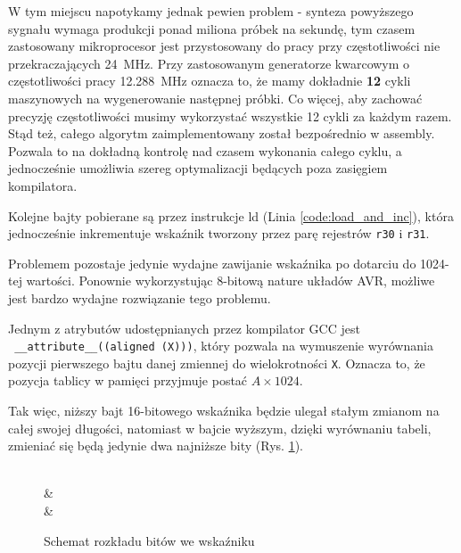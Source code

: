 \documentclass[12pt, a4paper]{article}
\begin{document}
W tym miejscu napotykamy jednak pewien problem - synteza powyższego sygnału wymaga produkcji ponad miliona próbek na sekundę,
tym czasem zastosowany mikroprocesor jest przystosowany do pracy przy częstotliwości nie przekraczających \qty{24}{\MHz}.
Przy zastosowanym generatorze kwarcowym o częstotliwości pracy \qty{12,288}{\MHz} oznacza to, że mamy dokładnie \textbf{12} cykli maszynowych
na wygenerowanie następnej próbki. Co więcej, aby zachować precyzję częstotliwości musimy wykorzystać wszystkie 12 cykli za każdym razem.
Stąd też, całego algorytm zaimplementowany został bezpośrednio w assembly.
Pozwala to na dokładną kontrolę nad czasem wykonania całego cyklu, a jednocześnie umożliwia szereg optymalizacji
będących poza zasięgiem kompilatora.

Kolejne bajty pobierane są przez instrukcje ld (Linia \ref{code:load_and_inc}), która jednocześnie
inkrementuje wskaźnik tworzony przez parę rejestrów \verb|r30| i \verb|r31|.

Problemem pozostaje jedynie wydajne zawijanie wskaźnika po dotarciu do 1024-tej wartości.
Ponownie wykorzystując 8-bitową nature układów AVR, możliwe jest bardzo wydajne rozwiązanie tego problemu.

Jednym z atrybutów udostępnianych przez kompilator GCC jest\\
\verb| __attribute__((aligned (X)))|, który pozwala na wymuszenie
wyrównania pozycji pierwszego bajtu danej zmiennej do wielokrotności \verb|X|.
Oznacza to, że pozycja tablicy w pamięci przyjmuje postać $A \times 1024$.

Tak więc, niższy bajt 16-bitowego wskaźnika będzie ulegał stałym zmianom na całej swojej długości,
natomiast w bajcie wyższym, dzięki wyrównaniu tabeli, zmieniać się będą jedynie dwa najniższe bity (Rys. \ref{fig:bits_ex}).

\begin{figure}[h]
	\centering
	\hfill

	\begin{bytefield}[bitwidth=7mm,endianness=big]{16}
		 \\
		 & \\
		 & \\
	\end{bytefield}
	\caption{Schemat rozkładu bitów we wskaźniku}
	\label{fig:bits_ex}
\end{figure}
\end{document}
